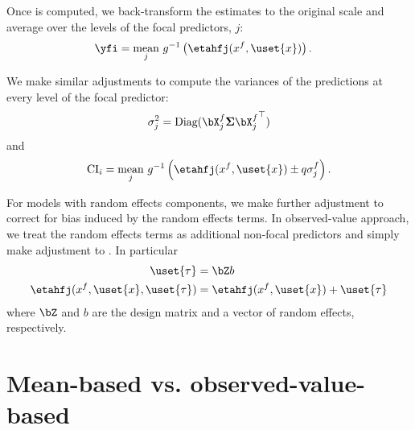 Once  is computed, we back-transform the estimates to the original scale and average over the levels of the focal predictors, $j$:
%
\begin{align}\label{eq:pop_response} 
\yfi  &= \underset{j}{\textrm{mean}} ~ g^{-1} \left(\etahfj(x^f, \uset{x})\right).
\end{align}
%

We make similar adjustments to compute the variances of the predictions at every level of the focal predictor:
%
\begin{align}
\sigma_j^2 = \textrm{Diag}(\bX^{f}_j \boldsymbol{\Sigma} {\bX^{f}_j}^\top)
\end{align}
%
and
%
\begin{align}
\mathrm{CI}_i = \underset{j}{\textrm{mean}} ~ g^{-1} \left(\etahfj(x^f, \uset{x}) \pm q\sigma^f_{j}\right).
\end{align}
%

For models with random effects components, we make further adjustment to correct for bias induced by the random effects terms. In observed-value approach, we treat the random effects terms as additional non-focal predictors and simply make adjustment to . In particular
%
\begin{align}\label{eq:pop_eta_re} 
\uset{\tau} &= \bZ b \nonumber \\
\etahfj(x^f, \uset{x}, \uset{\tau})  &= \etahfj(x^f, \uset{x}) + \uset{\tau}
\end{align}
where $\bZ$ and $b$ are the design matrix and a vector of random effects, respectively.

\section{Mean-based vs. observed-value-based}

